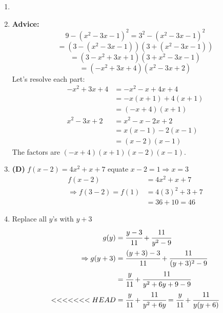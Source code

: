 \begin{multicols}{2}
\begin{enumerate}[label={\textbf{\arabic*.}}]
\item
\item \textbf{Advice:}
\[ 9 - (x^2 - 3x - 1)^2 = 3^2 - (x^2 - 3x - 1)^2\]
\[ = (3 - (x^2 - 3x - 1))(3 + (x^2 - 3x - 1))\]
\[ = (3 - x^2 + 3x + 1)(3 + x^2 - 3x - 1) \]
\[= (-x^2 + 3x + 4)(x^2 - 3x + 2)\]
Let's resolve each part:
\begin{align*}
  -x^2 + 3x + 4 &= -x^2 - x + 4x + 4 \\
  &= -x(x + 1) + 4(x + 1) \\
  &= (-x + 4)(x + 1)\\
  x^2 - 3x + 2 &= x^2 - x - 2x + 2 \\
  &= x(x - 1) - 2(x - 1) \\
  &= (x - 2)(x - 1)
\end{align*}
The factors are \((-x + 4)(x + 1)(x - 2)(x - 1)\).

\item \textbf{(D)} $f(x - 2) = 4x^2 + x + 7 $ equate $x - 2 = 1 \Rightarrow x = 3$
\begin{align*}
  f(x - 2) &= 4x^2 + x + 7 \\
  \Rightarrow  f(3 - 2) = f(1) &= 4(3)^2 + 3 + 7 \\
  & = 36 + 10 = 46
\end{align*}

\item Replace all \(y\)'s with \(y + 3\)
\begin{align*}
  g(y) &= \cfrac{y - 3}{11} + \cfrac{11}{y^2 - 9} \\
  \Rightarrow  g(y + 3) &= \cfrac{(y + 3) - 3}{11} + \cfrac{11}{(y + 3)^2 - 9}  \\
  & = \cfrac{y}{11} + \cfrac{11}{y^2 + 6y + 9 -9} \\
  <<<<<<< HEAD
  & = \cfrac{y}{11} + \cfrac{11}{y^2 + 6y} = \cfrac{y}{11} + \cfrac{11}{y (y + 6 )}
\end{align*}


\end{enumerate}
\end{multicols}
